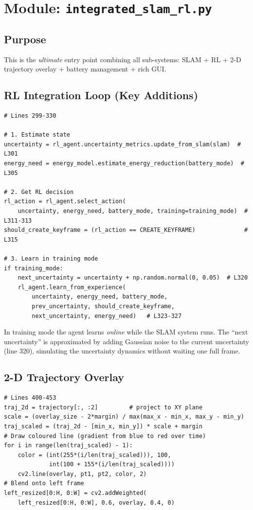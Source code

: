 \documentclass[12pt,a4paper,twoside]{report}
\theoremstyle{definition}
\begin{document}
\chapter{Module: \texttt{integrated\_slam\_rl.py}}

\section{Purpose}

This is the \emph{ultimate} entry point combining all sub-systems:
SLAM + RL + 2-D trajectory overlay + battery management + rich GUI.

\section{RL Integration Loop (Key Additions)}

\begin{lstlisting}
# Lines 299-330

# 1. Estimate state
uncertainty = rl_agent.uncertainty_metrics.update_from_slam(slam)  # L301
energy_need = energy_model.estimate_energy_reduction(battery_mode)  # L305

# 2. Get RL decision
rl_action = rl_agent.select_action(
    uncertainty, energy_need, battery_mode, training=training_mode)  # L311-313
should_create_keyframe = (rl_action == CREATE_KEYFRAME)              # L315

# 3. Learn in training mode
if training_mode:
    next_uncertainty = uncertainty + np.random.normal(0, 0.05)  # L320
    rl_agent.learn_from_experience(
        uncertainty, energy_need, battery_mode,
        prev_uncertainty, should_create_keyframe,
        next_uncertainty, energy_need)   # L323-327
\end{lstlisting}

\noindent In training mode the agent learns \emph{online} while the SLAM system
runs. The ``next uncertainty'' is approximated by adding Gaussian noise to the
current uncertainty (line 320), simulating the uncertainty dynamics without
waiting one full frame.

\section{2-D Trajectory Overlay}

\begin{lstlisting}
# Lines 400-453
traj_2d = trajectory[:, :2]         # project to XY plane
scale = (overlay_size - 2*margin) / max(max_x - min_x, max_y - min_y)
traj_scaled = (traj_2d - [min_x, min_y]) * scale + margin
# Draw coloured line (gradient from blue to red over time)
for i in range(len(traj_scaled) - 1):
    color = (int(255*(i/len(traj_scaled))), 100,
             int(100 + 155*(i/len(traj_scaled))))
    cv2.line(overlay, pt1, pt2, color, 2)
# Blend onto left frame
left_resized[0:H, 0:W] = cv2.addWeighted(
    left_resized[0:H, 0:W], 0.6, overlay, 0.4, 0)
\end{lstlisting}
\end{document}
